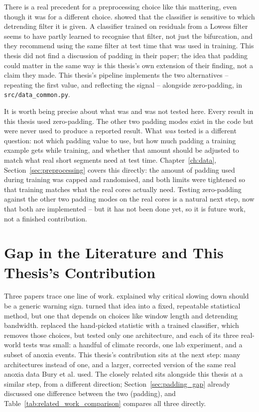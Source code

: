 There is a real precedent for a preprocessing choice like this mattering, even though it was for a different choice. \citet{dablander2022} showed that the \citet{bury2021} classifier is sensitive to which detrending filter it is given. A classifier trained on residuals from a Lowess filter seems to have partly learned to recognise that filter, not just the bifurcation, and they recommend using the same filter at test time that was used in training. This thesis did not find a discussion of padding in their paper; the idea that padding could matter in the same way is this thesis's own extension of their finding, not a claim they made. This thesis's pipeline implements the two alternatives -- repeating the first value, and reflecting the signal -- alongside zero-padding, in \texttt{src/data\_common.py}.

It is worth being precise about what was and was not tested here. Every result in this thesis used zero-padding. The other two padding modes exist in the code but were never used to produce a reported result. What \emph{was} tested is a different question: not which padding value to use, but how much padding a training example gets while training, and whether that amount should be adjusted to match what real short segments need at test time. Chapter~\ref{ch:data}, Section~\ref{sec:preprocessing} covers this directly: the amount of padding used during training was capped and randomised, and both limits were tightened so that training matches what the real cores actually need. Testing zero-padding against the other two padding modes on the real cores is a natural next step, now that both are implemented -- but it has not been done yet, so it is future work, not a finished contribution.

\section{Gap in the Literature and This Thesis's Contribution}
Three papers trace one line of work. \citet{scheffer2009} explained why critical slowing down should be a generic warning sign. \citet{dakos2012} turned that idea into a fixed, repeatable statistical method, but one that depends on choices like window length and detrending bandwidth. \citet{bury2021} replaced the hand-picked statistic with a trained classifier, which removes those choices, but tested only one architecture, and each of its three real-world tests was small: a handful of climate records, one lab experiment, and a subset of anoxia events. This thesis's contribution sits at the next step: many architectures instead of one, and a larger, corrected version of the same real anoxia data Bury et al. used. The closely related \citet{babazadeh2025} sits alongside this thesis at a similar step, from a different direction; Section~\ref{sec:padding_gap} already discussed one difference between the two (padding), and Table~\ref{tab:related_work_comparison} compares all three directly.

